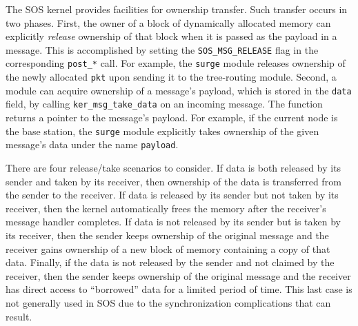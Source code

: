 The SOS kernel provides facilities for ownership transfer.  Such
transfer occurs in two phases.  
%
First, the owner of a block of dynamically allocated memory can explicitly {\em
  release} ownership of that block when it is passed as the payload in
  a message.  This is accomplished by setting the
\texttt{SOS\_MSG\_RELEASE} flag in the corresponding
  {\tt post\_*} call.  
  For example, the {\tt surge}
  module releases ownership of the newly allocated {\tt pkt} upon
  sending it to the tree-routing module.
  Second, a module can acquire ownership of a message's payload, which
  is stored in the {\tt data} field, by calling
\texttt{ker\_msg\_take\_data} on an incoming message.  The function
  returns a pointer to the message's payload.  For example,
  if the current node is the base station,
  the {\tt surge} module explicitly takes ownership of the given
  message's data under the name {\tt payload}.

%
There are four release/take scenarios to consider.  If data is
both released by its sender and taken by its receiver, then ownership
of the data is transferred from the sender to the receiver.
If data is released by its sender but not taken by its receiver,
then the kernel automatically frees the memory after
the receiver's message handler completes.  If data is not released
by its sender but is taken by its receiver, then the sender keeps
ownership of the original message and the receiver gains ownership of
a new block of memory containing a copy of that data.  Finally, if the data is
not released by the sender and not claimed by the receiver, then the sender
keeps ownership of the original message and the receiver has direct access to
``borrowed'' data for a limited period of time.  This last case is not generally used
in SOS due to the synchronization complications that can result.
%



